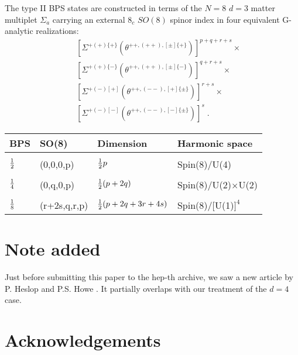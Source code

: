 \documentclass[a4paper,12pt]{article}
\begin{document}
The type II BPS states are constructed in terms of the $N=8$ $d=3$ 
matter multiplet $\Sigma_{\dot a}$ carrying an external $8_c$ 
$SO(8)$ spinor index in four equivalent G-analytic realizations: 
\begin{eqnarray}
  &&[\Sigma^{+(+)\{+\}}
(\theta^{++,(++),[\pm]\{+\}})]^{p+q+r+s}\times \nonumber\\ 
  &&[\Sigma^{+(+)\{-\}} (\theta^{++,(++),[\pm]\{-\}})]^{q+r+s}\times  \nonumber\\ 
  &&[\Sigma^{+(-)[+]} (\theta^{++,(--),[+]\{\pm\}})]^{r+s}\times 
\nonumber\\ 
  &&[\Sigma^{+(-)[-]} 
(\theta^{++,(--),[-]\{\pm\}})]^{s}\;. \label{8.033} 
\end{eqnarray}


\begin{table}[h]
  \begin{center}
    \leavevmode
\label{bps33} 
    \begin{tabular}{llll}
 BPS & SO(8)  & Dimension & Harmonic space \\ \hline
  \\
 ${1\over 2}$ & (0,0,0,p) & ${1\over 2}p$ & Spin(8)/U(4) \\
  \\
 ${1\over 4}$ & (0,q,0,p) & ${1\over 2}(p+2q)$ & Spin(8)/U(2)$\times$U(2) \\
  \\ 
 ${1\over 8}$ & (r+2s,q,r,p) & ${1\over 2}(p+2q+3r+4s)$ & 
Spin(8)/[U(1)$]^4$ \\ 
    \end{tabular}
  \end{center}
\end{table}
\vfill\eject   


\section*{Note added} Just before submitting this paper to the hep-th archive, 
we saw a new article by P. Heslop and P.S. Howe \cite{HHowe}. It 
partially overlaps with our treatment of the $d=4$ case. 




\section*{Acknowledgements}
\end{document}
